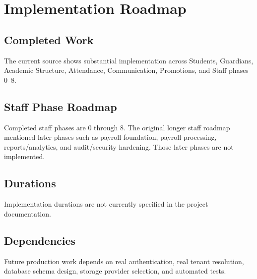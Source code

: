 \chapter{Implementation Roadmap}
\section{Completed Work}
The current source shows substantial implementation across Students, Guardians, Academic Structure, Attendance, Communication, Promotions, and Staff phases 0--8.

\section{Staff Phase Roadmap}
Completed staff phases are 0 through 8. The original longer staff roadmap mentioned later phases such as payroll foundation, payroll processing, reports/analytics, and audit/security hardening. Those later phases are not implemented.

\section{Durations}
Implementation durations are not currently specified in the project documentation.

\section{Dependencies}
Future production work depends on real authentication, real tenant resolution, database schema design, storage provider selection, and automated tests.
